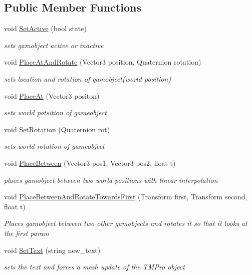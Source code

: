 \subsection*{Public Member Functions}
\begin{DoxyCompactItemize}
\item 
void \mbox{\hyperlink{class_interaction_prompt_a409ac8c36942c10be65238a7281932c2}{Set\+Active}} (bool state)
\begin{DoxyCompactList}\small\item\em sets gamobject active or inactive \end{DoxyCompactList}\item 
void \mbox{\hyperlink{class_interaction_prompt_a86cfcd9a578717260de54c04a51d6175}{Place\+At\+And\+Rotate}} (Vector3 position, Quaternion rotation)
\begin{DoxyCompactList}\small\item\em sets location and rotation of gamobject(world position) \end{DoxyCompactList}\item 
void \mbox{\hyperlink{class_interaction_prompt_affe2190bb7ca5e5476074dbbbb846b3c}{Place\+At}} (Vector3 positon)
\begin{DoxyCompactList}\small\item\em sets world potsition of gameobject \end{DoxyCompactList}\item 
void \mbox{\hyperlink{class_interaction_prompt_a88851b5b82c1413a6aad2c02d24708f6}{Set\+Rotation}} (Quaternion rot)
\begin{DoxyCompactList}\small\item\em sets world rotation of gameobject \end{DoxyCompactList}\item 
void \mbox{\hyperlink{class_interaction_prompt_a85caeb27db4542f995d8704966beefc1}{Place\+Between}} (Vector3 pos1, Vector3 pos2, float t)
\begin{DoxyCompactList}\small\item\em places gamobject between two world positions with linear interpolation \end{DoxyCompactList}\item 
void \mbox{\hyperlink{class_interaction_prompt_a98a4e4f01398f5d5f5e56802e67cffd2}{Place\+Between\+And\+Rotate\+Towards\+First}} (Transform first, Transform second, float t)
\begin{DoxyCompactList}\small\item\em Places gamobject between two other gamobjects and rotates it so that it looks at the first param \end{DoxyCompactList}\item 
void \mbox{\hyperlink{class_interaction_prompt_ac68329e8bcb18bc4556695f506d5b410}{Set\+Text}} (string new\+\_\+text)
\begin{DoxyCompactList}\small\item\em sets the text and forces a mesh update of the T\+M\+Pro object \end{DoxyCompactList}\end{DoxyCompactItemize}
